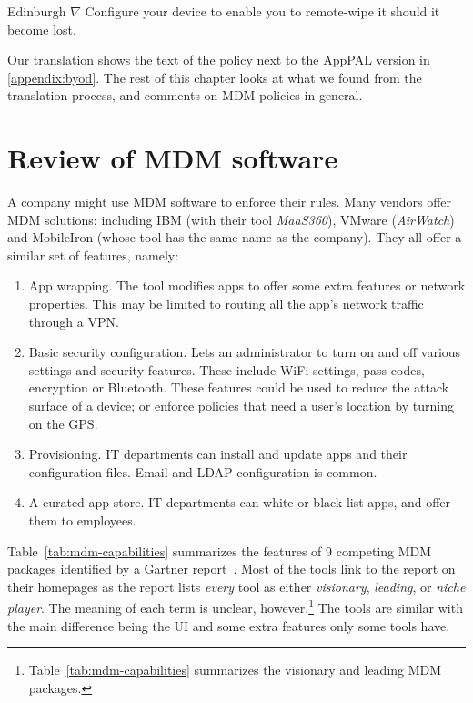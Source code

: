 \documentclass[thesis.tex]{subfiles}
\begin{document}
\begin{policyrule}{Edinburgh}
  $\nabla$ Configure your device to enable you to remote-wipe it should it become lost.
\end{policyrule}

Our translation shows the text of the policy next to the AppPAL version in
\autoref{appendix:byod}. The rest of this chapter looks at what we
found from the translation process, and comments on \ac{MDM} policies in
general.

\section{Review of MDM software}

A company might use \ac{MDM} software to enforce their rules.  Many
vendors offer \ac{MDM} solutions: including IBM (with their tool
\emph{MaaS360}), VMware (\emph{AirWatch}) and MobileIron (whose tool
has the same name as the company). They all offer a similar set of
features, namely:
\begin{enumerate}
\item App wrapping. The tool modifies apps to offer some extra
  features or network properties. This may be limited to routing all
  the app's network traffic through a VPN.
\item Basic security configuration. Lets an administrator to turn on
  and off various settings and security features. These
  include WiFi settings, pass-codes, encryption or Bluetooth.  These
  features could be used to reduce the attack surface of a device; or enforce policies that need a user's location
  by turning on the GPS.
\item Provisioning. IT departments can install and update apps and
  their configuration files. Email and LDAP configuration is common.
\item A curated app store. IT departments can white-or-black-list apps, and offer them to employees.
\end{enumerate}

Table~\ref{tab:mdm-capabilities} summarizes the features of 9 competing \ac{MDM} packages identified by a Gartner
report~\cite{rob_smith_magic_2016}.  Most of
the tools link to the report on their homepages as the report lists
\emph{every} tool as either \emph{visionary}, \emph{leading}, or
\emph{niche player}. The meaning of each term is unclear, however.\footnote{Table~\ref{tab:mdm-capabilities}
  summarizes the visionary and leading \ac{MDM} packages.}  The tools are similar with the main difference being the UI
and some extra features only some tools have.
\end{document}

